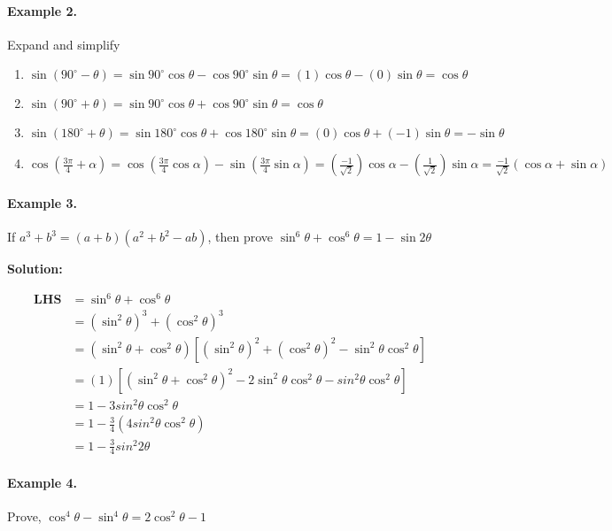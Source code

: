 \documentclass{article}
\begin{document}
\paragraph{Example 2.}
Expand and simplify

\begin{enumerate}[label=\roman*)]
  \item $\sin(90^{\circ}-\theta) = \sin90^{\circ}\cos\theta - \cos90^{\circ}\sin\theta = (1)\cos\theta - (0)\sin\theta = \cos\theta$
  \item $\sin(90^{\circ}+\theta) = \sin90^{\circ}\cos\theta + \cos90^{\circ}\sin\theta = \cos\theta$
  \item $\sin(180^{\circ}+\theta) = \sin180^{\circ}\cos\theta + \cos180^{\circ}\sin\theta = (0)\cos\theta + (-1)\sin\theta = -\sin\theta$
  \item $\cos \left(\frac{3\pi}{4}+\alpha \right) = \cos \left(\frac{3\pi}{4}\cos\alpha \right) - \sin \left(\frac{3\pi}{4}\sin\alpha \right) = \left(\frac{-1}{\sqrt{2}}\right)\cos\alpha - \left(\frac{1}{\sqrt{2}}\right)\sin\alpha = \frac{-1}{\sqrt{2}}(\cos\alpha + \sin\alpha)$
\end{enumerate}

\paragraph{Example 3.}
If $a^{3}+b^{3} = (a+b)(a^{2}+b^{2}-ab)$, then prove $\sin^{6}\theta + \cos^{6}\theta = 1 - \sin 2\theta$

{\scriptsize \textbf{Solution:}}

\[
  \begin{aligned}
    \textbf{LHS} &= \sin^{6}\theta + \cos^{6}\theta \\
                 &= (\sin^{2}\theta)^{3} + (\cos^{2}\theta)^{3} \\
                 &= (\sin^{2}\theta+\cos^{2}\theta)[(\sin^{2}\theta)^{2}+(\cos^{2}\theta)^{2} - \sin^{2}\theta \cos^{2}\theta] \\
                 &= (1) [(\sin^{2}\theta+\cos^{2}\theta)^{2} - 2\sin^{2}\theta \cos^{2}\theta - sin^{2}\theta \cos^{2}\theta] \\
                 &= 1 - 3 sin^{2}\theta \cos^{2}\theta \\
                 &= 1 - \frac{3}{4} (4sin^{2}\theta \cos^{2}\theta) \\
                 &= 1 - \frac{3}{4} sin^{2}2\theta
  \end{aligned}
\]

\paragraph{Example 4.}
Prove, $\cos^{4}\theta-\sin^{4}\theta = 2\cos^{2}\theta-1$
\end{document}
